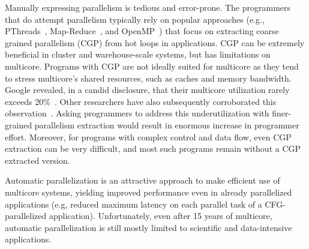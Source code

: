 Manually expressing parallelism is tedious and error-prone. The programmers that
do attempt parallelism typically rely on popular approaches (e.g.,
PThreads~\cite{pthread:web}, Map-Reduce~\cite{dean:08:cacm}, and
OpenMP~\cite{openmp:web}) that focus on extracting coarse grained parallelism
(CGP) from hot loops in applications.
%
CGP can be extremely beneficial in cluster and warehouse-scale systems, but has
limitations on multicore.  Programs with CGP are not ideally suited for
multicore as they tend to stress multicore's shared resources, such as caches
and memory bandwidth.  Google revealed, in a candid disclosure, that their
multicore utilization rarely exceeds 20\%~\cite{barroso:07:computer}. Other
researchers have also subsequently corroborated this
observation~\cite{chung:13:isca}.
%
Asking programmers to address this underutilization with finer-grained
parallelism extraction would result in enormous increase in programmer effort.
%
Moreover, for programs with complex control and data flow, even CGP extraction
can be very difficult, and most such programs remain without a CGP extracted
version.

Automatic parallelization is an attractive approach to make efficient use of
multicore systems, yielding improved performance even in already parallelized
applications (e.g, reduced maximum latency on each parallel task of a
CFG-parallelized application). Unfortunately, even after 15 years of multicore,
automatic parallelization is still mostly limited to scientific and
data-intensive applications.

